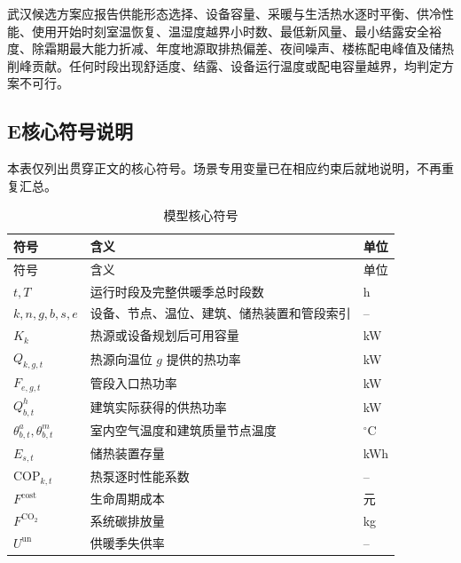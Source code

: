 武汉候选方案应报告供能形态选择、设备容量、采暖与生活热水逐时平衡、供冷性能、使用开始时刻室温恢复、温湿度越界小时数、最低新风量、最小结露安全裕度、除霜期最大能力折减、年度地源取排热偏差、夜间噪声、楼栋配电峰值及储热削峰贡献。任何时段出现舒适度、结露、设备运行温度或配电容量越界，均判定方案不可行。

\clearpage

\subsection*{E\quad 核心符号说明}

本表仅列出贯穿正文的核心符号。场景专用变量已在相应约束后就地说明，不再重复汇总。

\begin{longtable}{p{}p{}p{}}
\caption{模型核心符号}\label{tab:symbols}\\
\toprule
符号 & 含义 & 单位\\
\midrule
\endfirsthead
\toprule
符号 & 含义 & 单位\\
\midrule
\endhead
$t,T$ & 运行时段及完整供暖季总时段数 & h\\
$k,n,g,b,s,e$ & 设备、节点、温位、建筑、储热装置和管段索引 & --\\
$K_k$ & 热源或设备规划后可用容量 & kW\\
$Q_{k,g,t}$ & 热源向温位 $g$ 提供的热功率 & kW\\
$F_{e,g,t}$ & 管段入口热功率 & kW\\
$Q_{b,t}^{h}$ & 建筑实际获得的供热功率 & kW\\
$\theta_{b,t}^{a},\theta_{b,t}^{m}$ & 室内空气温度和建筑质量节点温度 & $^{\circ}$C\\
$E_{s,t}$ & 储热装置存量 & kWh\\
$\mathrm{COP}_{k,t}$ & 热泵逐时性能系数 & --\\
$F^{\mathrm{cost}}$ & 生命周期成本 & 元\\
$F^{\mathrm{CO_2}}$ & 系统碳排放量 & kg\\
$U^{\mathrm{un}}$ & 供暖季失供率 & --\\
\bottomrule
\end{longtable}

